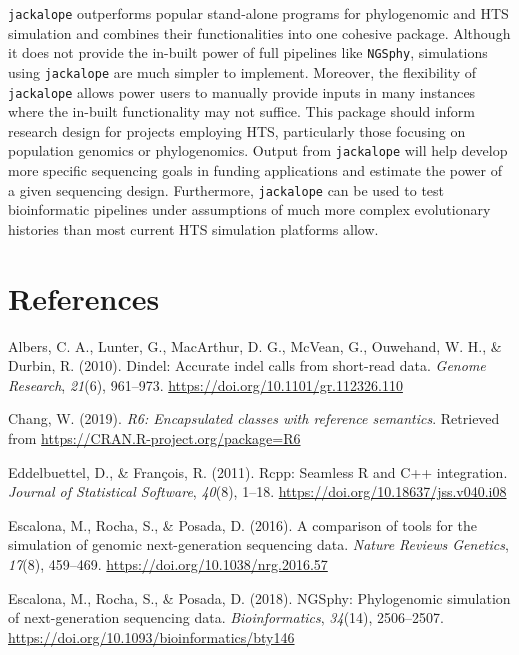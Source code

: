 \documentclass[12pt,]{article}
\begin{document}
\texttt{jackalope} outperforms popular stand-alone programs for phylogenomic and HTS
simulation and combines their functionalities into one cohesive package.
Although it does not provide the in-built power of full pipelines like \texttt{NGSphy},
simulations using \texttt{jackalope} are much simpler to implement.
Moreover, the flexibility of \texttt{jackalope} allows power users to manually
provide inputs in many instances where the in-built functionality may not suffice.
This package should inform research design for projects employing HTS,
particularly those focusing on population genomics or phylogenomics.
Output from \texttt{jackalope} will help develop more specific sequencing goals
in funding applications and estimate the power of a given sequencing design.
Furthermore, \texttt{jackalope} can be used to test bioinformatic pipelines under
assumptions of much more complex evolutionary histories than most current HTS
simulation platforms allow.

\hypertarget{references}{%
\section{References}\label{references}}


\hypertarget{refs}{}
\leavevmode\hypertarget{ref-Albers_2010}{}%
Albers, C. A., Lunter, G., MacArthur, D. G., McVean, G., Ouwehand, W. H., \& Durbin, R. (2010). Dindel: Accurate indel calls from short-read data. \emph{Genome Research}, \emph{21}(6), 961--973. \url{https://doi.org/10.1101/gr.112326.110}

\leavevmode\hypertarget{ref-Chang_2019}{}%
Chang, W. (2019). \emph{R6: Encapsulated classes with reference semantics}. Retrieved from \url{https://CRAN.R-project.org/package=R6}

\leavevmode\hypertarget{ref-Eddelbuettel_2011}{}%
Eddelbuettel, D., \& François, R. (2011). Rcpp: Seamless R and C++ integration. \emph{Journal of Statistical Software}, \emph{40}(8), 1--18. \url{https://doi.org/10.18637/jss.v040.i08}

\leavevmode\hypertarget{ref-Escalona_2016}{}%
Escalona, M., Rocha, S., \& Posada, D. (2016). A comparison of tools for the simulation of genomic next-generation sequencing data. \emph{Nature Reviews Genetics}, \emph{17}(8), 459--469. \url{https://doi.org/10.1038/nrg.2016.57}

\leavevmode\hypertarget{ref-Escalona_2018}{}%
Escalona, M., Rocha, S., \& Posada, D. (2018). NGSphy: Phylogenomic simulation of next-generation sequencing data. \emph{Bioinformatics}, \emph{34}(14), 2506--2507. \url{https://doi.org/10.1093/bioinformatics/bty146}
\end{document}
